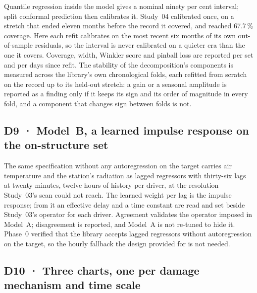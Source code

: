 \documentclass[11pt,a4paper]{article}
\begin{document}
Quantile regression inside the model gives a nominal ninety per cent interval;
split conformal prediction then calibrates it. Study~04 calibrated once, on a
stretch that ended eleven months before the record it covered, and reached
67.7\,\% coverage. Here each refit calibrates on the most recent six months of
its own out-of-sample residuals, so the interval is never calibrated on a
quieter era than the one it covers. Coverage, width, Winkler score and pinball
loss are reported per set and per days since refit. The stability of the
decomposition's components is measured across the library's own
chronological folds, each refitted from scratch on the record up to its
held-out stretch: a gain or a seasonal amplitude is reported as a finding
only if it keeps its sign and its order of magnitude in every fold, and a
component that changes sign between folds is not.

\subsection{D9 · Model~B, a learned impulse response on the on-structure set}

The same specification without any autoregression on the target carries air
temperature and the station's radiation as lagged regressors with thirty-six
lags at twenty minutes, twelve hours of history per driver, at the resolution
Study~03's scan could not reach. The learned weight per lag is the impulse
response; from it an effective delay and a time constant are read and set
beside Study~03's operator for each driver. Agreement validates the operator
imposed in Model~A; disagreement is reported, and Model~A is not re-tuned to
hide it. Phase~0 verified that the library accepts lagged regressors without
autoregression on the target, so the hourly fallback the design provided for is
not needed.

\subsection{D10 · Three charts, one per damage mechanism and time scale}
\end{document}
